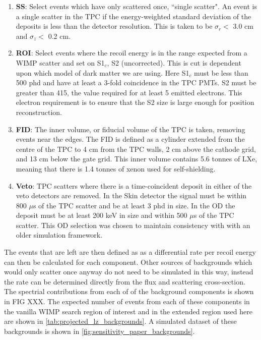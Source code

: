 \begin{enumerate}
    \item \textbf{SS}: Select events which have only scattered once, ``single scatter". An event is a single scatter in the TPC if the energy-weighted standard deviation of the deposits is less than the detector resolution. This is taken to be $\sigma_r <$ 3.0 cm and $\sigma_z <$ 0.2 cm.
    \item \textbf{ROI}: Select events where the recoil energy is in the range expected from a WIMP scatter and set on S1$_c$, S2 (uncorrected). This is cut is dependent upon which model of dark matter we are using. Here S1$_c$ must be less than 500 phd and have at least a 3-fold coincidence in the TPC PMTs. S2 must be greater than 415, the value required for at least 5 emitted electrons. This electron requirement is to ensure that the S2 size is large enough for position reconstruction.
    \item \textbf{FID}: The inner volume, or fiducial volume of the TPC is taken, removing events near the edges. The FID is defined as a cylinder extended from the centre of the TPC to 4 cm from the TPC walls, 2 cm above the cathode grid, and 13 cm below the gate grid. This inner volume contains 5.6 tonnes of LXe, meaning that there is 1.4 tonnes of xenon used for self-shielding.
    \item \textbf{Veto}: TPC scatters where there is a time-coincident deposit in either of the veto detectors are removed. In the Skin detector the signal must be within 800 $\mu$s of the TPC scatter and be at least 3 phd in size. In the OD the deposit must be at least 200 keV in size and within 500 $\mu$s of the TPC scatter. This OD selection was chosen to maintain consistency with \cite{LZ_projected_sensitivity_paper_ref} with an older simulation framework.
\end{enumerate}
The events that are left are then defined as as a differential rate per recoil energy can then be calculated for each component.
Other sources of backgrounds which would only scatter once anyway do not need to be simulated in this way, instead the rate can be determined directly from the flux and scattering cross-section.
The spectrial contributions from each of of the background components is shown in FIG XXX.
The expected number of events from each of these components in the vanilla WIMP search region of interest and in the extended region used here are shown in 
\autoref{tab:projected_lz_backgrounds}.
A simulated dataset of these backgrounds is shown in  \autoref{fig:sensitivity_paper_backgrounds}.

